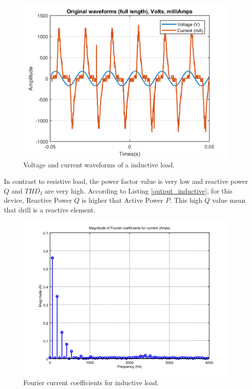 \documentclass[journal]{IEEEtran}
\begin{document}
\begin{figure}[h]
\centering
\includegraphics[clip,width=\columnwidth]
{original_waveform_drill.png}
\caption{Voltage and current waveforms of a inductive load.}
\label{original_inductive_load}
\end{figure}

In contrast to resistive load, the power factor value is 
very low and reactive power $Q$ and $THD_I$ are very high.
According to Listing \ref{output_inductive},
for this device, Reactive Power $Q$ is higher that Active 
Power $P$. 
This high $Q$ value mean that drill is a reactive element. 

\begin{figure}[h]
\centering
\includegraphics[clip,width=\columnwidth]
{zoomed_current_furier_coefficients_drill.png}
\caption{Fourier current coefficients for inductive load.}
\label{fourier_corrent_coefficients_inductive}
\end{figure}
\end{document}
